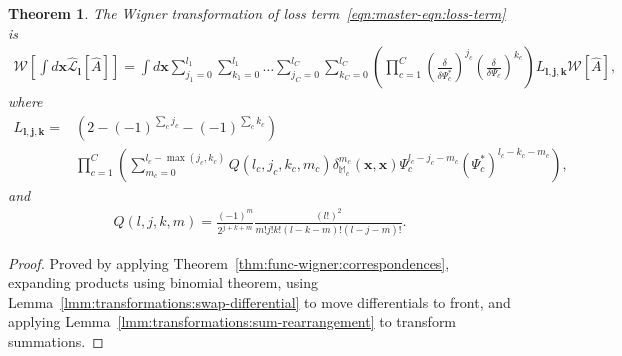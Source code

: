 \documentclass[12pt,aip,jmp,amssymb,amsmath]{revtex4-1}
\newtheorem{theorem}{Theorem}
\begin{document}
\begin{theorem}
\label{thm:transformations:w-losses}
    The Wigner transformation of loss term~\ref{eqn:master-eqn:loss-term} is
    \begin{equation*}\begin{split}
        \mathcal{W} \left[ \int d\boldsymbol{x} \hat{\mathcal{L}}_{\boldsymbol{l}} [\hat{A}] \right]
        = \int d\boldsymbol{x}
            \sum_{j_1=0}^{l_1} \sum_{k_1=0}^{l_1} \ldots
            \sum_{j_C=0}^{l_C} \sum_{k_C=0}^{l_C}
                \left(
                    \prod_{c=1}^C
                        \left( \frac{\delta}{\delta \Psi_c^*} \right)^{j_c}
                        \left( \frac{\delta}{\delta \Psi_c} \right)^{k_c}
                \right)
                L_{\boldsymbol{l}, \boldsymbol{j}, \boldsymbol{k}}
            \mathcal{W}[\hat{A}],
    \end{split}\end{equation*}
    where
    \begin{equation*}\begin{split}
        L_{\boldsymbol{l}, \boldsymbol{j}, \boldsymbol{k}}
        ={} & \left( 2 - (-1)^{\sum_c j_c} - (-1)^{\sum_c k_c} \right) \\
        &   \prod_{c=1}^C \left(
                \sum_{m_c=0}^{l_c - \max(j_c, k_c)}
                Q(l_c, j_c, k_c, m_c)
                \delta_{\mathbb{M}_c}^{m_c}(\boldsymbol{x}, \boldsymbol{x})
                \Psi_c^{l_c - j_c - m_c}
                (\Psi_c^*)^{l_c - k_c - m_c}
            \right),
    \end{split}\end{equation*}
    and
    \begin{equation*}\begin{split}
        Q(l, j, k, m)
        = \frac{(-1)^m}{2^{j + k + m}}
            \frac{(l!)^2}{m! j! k! (l - k - m)! (l - j - m)!}.
    \end{split}\end{equation*}
\end{theorem}
\begin{proof}
Proved by applying Theorem~\ref{thm:func-wigner:correspondences}, expanding products using binomial theorem, using Lemma~\ref{lmm:transformations:swap-differential} to move differentials to front, and applying Lemma~\ref{lmm:transformations:sum-rearrangement} to transform summations.
\end{proof}



\end{document}
